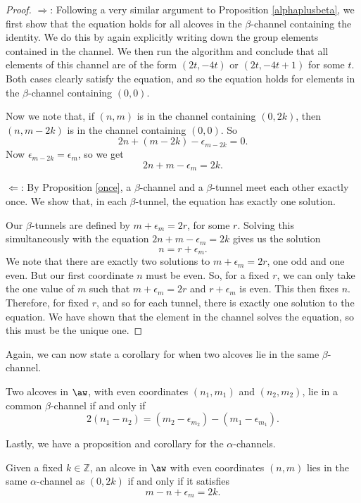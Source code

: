 \documentclass[11pt]{article}
\begin{document}
\begin{proof}
    $\Rightarrow$: Following a very similar argument to Proposition \ref{alphaplusbeta}, we first show that the equation holds for all alcoves in the $\beta$-channel containing the identity. We do this by again explicitly writing down the group elements contained in the channel. We then run the algorithm and conclude that all elements of this channel are of the form $(2t,-4t)$ or $(2t,-4t+1)$ for some $t$. Both cases clearly satisfy the equation, and so the equation holds for elements in the $\beta$-channel containing $(0,0)$. 

    Now we note that, if $(n,m)$ is in the channel containing $(0,2k)$, then $(n,m-2k)$ is in the channel containing $(0,0)$. So
    \[2n+(m-2k)-\epsilon_{m-2k}=0.\]
    Now $\epsilon_{m-2k}=\epsilon_m$, so we get
    \[2n+m-\epsilon_m=2k.\]


    $\Leftarrow$: By Proposition \ref{once}, a $\beta$-channel and a $\beta$-tunnel meet each other exactly once. We show that, in each $\beta$-tunnel, the equation has exactly one solution. 

    Our $\beta$-tunnels are defined by $m+\epsilon_m=2r$, for some $r$. Solving this simultaneously with the equation $2n+m-\epsilon_m=2k$ gives us the solution 
    \[n=r+\epsilon_m.\]
    We note that there are exactly two solutions to $m+\epsilon_m=2r$, one odd and one even. But our first coordinate $n$ must be even. So, for a fixed $r$, we can only take the one value of $m$ such that $m+\epsilon_m=2r$ and $r+\epsilon_m$ is even. This then fixes $n$. Therefore, for fixed $r$, and so for each tunnel, there is exactly one solution to the equation. We have shown that the element in the channel solves the equation, so this must be the unique one. 
\end{proof}

Again, we can now state a corollary for when two alcoves lie in the same $\beta$-channel. 

\begin{corollary}
    Two alcoves in $\aw$, with even coordinates $(n_1,m_1)$ and $(n_2,m_2)$, lie in a common $\beta$-channel if and only if
    \[2(n_1-n_2)=(m_2-\epsilon_{m_2})-(m_1-\epsilon_{m_1}).\]
\end{corollary}
    
Lastly, we have a proposition and corollary for the $\alpha$-channels.

\begin{proposition}\label{alpha}
    Given a fixed $k\in \mathbb{Z}$, an alcove in $\aw$ with even coordinates $(n,m)$ lies in the same $\alpha$-channel as $(0,2k)$ if and only if it satisfies 
    \[m-n+\epsilon_m=2k.\]
\end{proposition}
\end{document}
